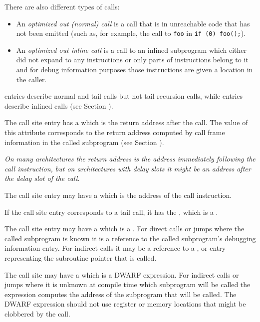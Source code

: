 There are also different types of  calls:
\begin{itemize}
\item
An \textit{optimized out (normal) call} is a call that is in unreachable code that 
has not been emitted (such as, for example, the call to \texttt{foo} in 
\texttt{if (0) foo();}).  
\item
An \textit{optimized out inline call}
is a call to an inlined subprogram which either did not expand to any instructions
or only parts of instructions belong to it and for debug information purposes those
instructions are given a location in the caller.
\end{itemize}

\DWTAGcallsite{} entries describe normal and tail calls but not tail recursion calls,
while \DWTAGinlinedsubroutine{} entries describe inlined calls 
(see Section ).

The call site entry has a 
\DWATcallreturnpcNAME{}
which is the return address after the call.  
The value of this attribute corresponds to the return address computed by 
call frame information in the called subprogram 
(see Section ).

\textit{On many architectures the return address is the address immediately following the
call instruction, but on architectures with delay slots it might
be an address after the delay slot of the call.}

The call site entry may have a 
\DWATcallpcNAME{}
 which is the
address of the call instruction.

If the call site entry corresponds to a tail call, it has the 
\DWATcalltailcallNAME{}
,
which is a \CLASSflag.

The call site entry may have a 
\DWATcalloriginNAME{}
which is a \CLASSreference.  For direct calls or jumps where the called subprogram is
known it is a reference to the called subprogram's debugging
information entry.  For indirect calls it may be a reference to a
\DWTAGvariable{}, \DWTAGformalparameter{} or \DWTAGmember{} entry representing
the subroutine pointer that is called.

The call site may have a 
\DWATcalltargetNAME{}
 which is
a DWARF expression.  For indirect calls or jumps where it is unknown at
compile time which subprogram will be called the expression computes the
address of the subprogram that will be called.  The DWARF expression should
not use register or memory locations that might be clobbered by the call.

